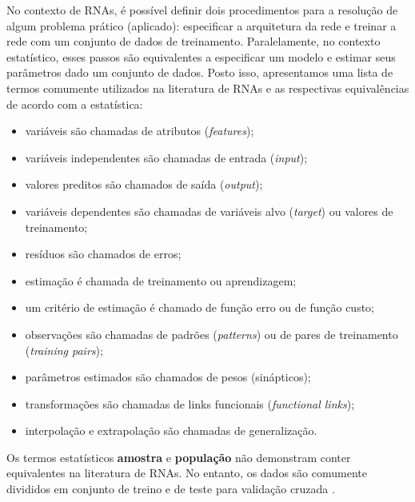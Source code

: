\documentclass{automatextcc}
\begin{document}
No contexto de RNAs, é possível definir dois procedimentos para a resolução de algum problema prático (aplicado): especificar a arquitetura da rede e treinar a rede com um conjunto de dados de treinamento. Paralelamente, no contexto estatístico, esses passos são equivalentes a especificar um modelo e estimar seus parâmetros dado um conjunto de dados. Posto isso, apresentamos uma lista de termos comumente utilizados na literatura de RNAs e as respectivas equivalências de acordo com a estatística:
\begin{itemize}
    \item variáveis são chamadas de atributos (\textit{features});
    \item variáveis independentes são chamadas de entrada (\textit{input});
    \item valores preditos são chamados de saída (\textit{output});
    \item variáveis dependentes são chamadas de variáveis alvo (\textit{target}) ou valores de treinamento;
    \item resíduos são chamados de erros;
    \item estimação é chamada de treinamento ou aprendizagem;
    \item um critério de estimação é chamado de função erro ou de função custo;
    \item observações são chamadas de padrões (\textit{patterns}) ou de pares de treinamento (\textit{training pairs});
    \item parâmetros estimados são chamados de pesos (sinápticos);
    \item transformações são chamadas de links funcionais (\textit{functional links});
    \item interpolação e extrapolação são chamadas de generalização.
\end{itemize}
Os termos estatísticos \textbf{amostra} e \textbf{população} não demonstram conter equivalentes na literatura de RNAs. No entanto, os dados são comumente divididos em conjunto de treino e de teste para validação cruzada \citep{cheng1994}.



\end{document}

